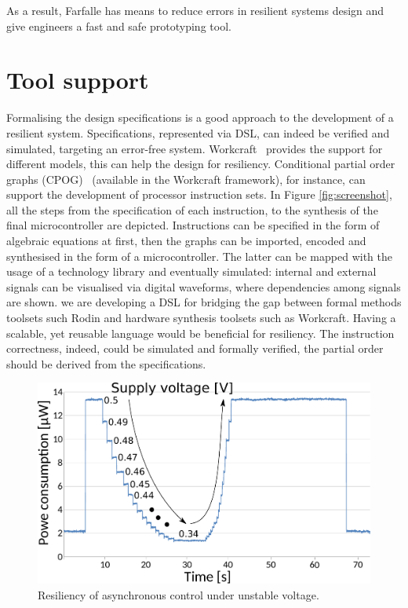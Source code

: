 \documentclass[conference]{IEEEtran}
\begin{document}
As a result, Farfalle has means to reduce errors in resilient systems design
and give engineers a fast and safe prototyping tool.

\section{Tool support\label{sec:tools}}

Formalising the design specifications is a good approach to the development of a resilient
system. Specifications, represented via DSL, can indeed be verified and
simulated, targeting an error-free system. Workcraft~\cite{workcraft_web} provides the support for different
models, this can help the design for resiliency. Conditional partial order graphs (CPOG)~\cite{ISA-formal}
(available in the Workcraft framework), for instance, can support the development of
processor instruction sets. In Figure \ref{fig:screenshot}, all the steps from the
specification of each instruction, to the synthesis of the final microcontroller are
depicted. Instructions can be specified in the form of algebraic equations at first, then the
graphs can be imported, encoded and synthesised in the form of a microcontroller. The latter
can be mapped with the usage of a technology library and eventually simulated: internal and
external signals can be visualised via digital waveforms, where dependencies among signals
are shown. we are developing a DSL for bridging the gap between formal methods toolsets such
Rodin and hardware synthesis toolsets such as Workcraft. Having a scalable, yet
reusable language would be beneficial for resiliency. The instruction correctness, indeed,
could be simulated and formally verified, the partial order should be derived from the
specifications.

\begin{figure}[h!]
\begin{center}
  \includegraphics[width=0.8\linewidth]{FIG/ope-chip.pdf}
  \vspace{-3mm}
  \caption{Resiliency of asynchronous control under unstable voltage.}
  \label{fig:voltage-resiliency}
\end{center}
\vspace{-3mm}
\end{figure}
\end{document}
